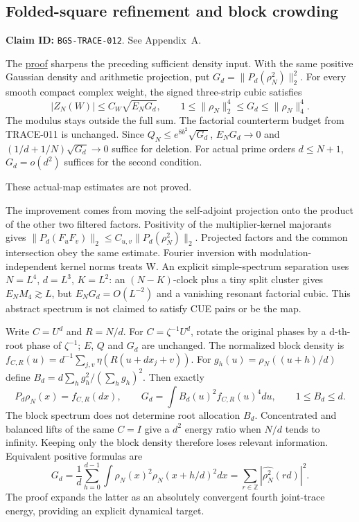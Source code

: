 \hypertarget{folded-square-refinement-and-block-crowding}{%
\subsection{Folded-square refinement and block crowding}\label{folded-square-refinement-and-block-crowding}}

\textbf{Claim ID:} \texttt{BGS-TRACE-012}. See Appendix~A.

\begin{theorem}\label{pass2:frontier-trace-012}

The \href{https://github.com/ChurilovMaksim/BGS/blob/main/mathematics/folded_quadratic_resonance_control.md}{proof}
sharpens the preceding sufficient density input. With the same positive
Gaussian density and arithmetic projection, put
\(G_d=\|P_d(\rho_N^2)\|_2^2\). For every smooth compact complex weight,
the signed three-strip cubic satisfies
\[
|Z_N(W)|\le C_W\sqrt{E_NG_d},\qquad
1\le\|\rho_N\|_2^4\le G_d\le\|\rho_N\|_4^4.
\]
The modulus stays outside the full sum. The factorial counterterm budget
from TRACE-011 is unchanged. Since \(Q_N\le e^{8b^2}\sqrt{G_d}\),
\(E_NG_d\to0\) and \((1/d+1/N)\sqrt{G_d}\to0\) suffice for deletion.
For actual prime orders \(d\le N+1\), \(G_d=o(d^2)\) suffices for the
second condition.

\end{theorem}

These actual-map estimates are not proved.

The improvement comes from moving the self-adjoint projection onto
the product of the other two filtered factors. Positivity of the
multiplier-kernel majorants gives
\(\|P_d(F_uF_v)\|_2\le C_{u,v}\|P_d(\rho_N^2)\|_2\).
Projected factors and the common intersection obey the same estimate.
Fourier inversion with modulation-independent kernel norms treats W.
An explicit simple-spectrum separation uses \(N=L^4\), \(d=L^3\), \(K=L^2\):
an \((N-K)\)-clock plus a tiny split cluster gives \(E_NM_4\gtrsim L\),
but \(E_NG_d=O(L^{-2})\) and a vanishing resonant factorial cubic.
This abstract spectrum is not claimed to satisfy CUE pairs or be the map.

Write \(C=U^d\) and \(R=N/d\). For \(C=\zeta^{-1}U^d\), rotate the original
phases by a d-th-root phase of \(\zeta^{-1}\); \(E\), \(Q\) and \(G_d\) are unchanged.
The normalized block density is
\(f_{C,R}(u)=d^{-1}\sum_{j,v}\eta(R(u+dx_j+v))\).
For \(g_h(u)=\rho_N((u+h)/d)\) define
\(B_d=d\sum_hg_h^2/(\sum_hg_h)^2\). Then exactly
\[
P_d\rho_N(x)=f_{C,R}(dx),\qquad
G_d=\int B_d(u)^2 f_{C,R}(u)^4du,\qquad 1\le B_d\le d.
\]
The block spectrum does not determine root allocation \(B_d\).
Concentrated and balanced lifts of the same \(C=I\) give a \(d^2\) energy
ratio when \(N/d\) tends to infinity. Keeping only the block density
therefore loses relevant information. Equivalent positive formulas are
\[
G_d=\frac1d\sum_{h=0}^{d-1}\int\rho_N(x)^2\rho_N(x+h/d)^2dx
=\sum_{r\in\mathbb Z}|\widehat{\rho_N^2}(rd)|^2.
\]
The proof expands the latter as an absolutely convergent fourth
joint-trace energy, providing an explicit dynamical target.

